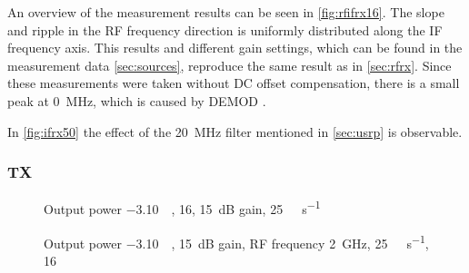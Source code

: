 \documentclass[12pt,a4paper,parskip=full]{scrartcl}
\begin{document}
An overview of the measurement results can be seen in \cref{fig:rfifrx16}. The slope and ripple
in the RF frequency direction is uniformly distributed along the IF frequency axis.
This results and different gain settings, which can be found in the measurement data \ref{sec:sources},
reproduce the same result as in \cref{sec:rfrx}. Since these measurements were taken without DC offset
compensation, there is a small peak at \SI{0}{\mega\hertz}, which is caused by DEMOD \cite{demod}.

In \ref{fig:ifrx50} the effect of the \SI{20}{\mega\hertz} filter mentioned in \cref{sec:usrp} is
observable.

\subsubsection{TX}
\label{sec:iftx}
\begin{figure}[htbp]
    \centering
{}
    \caption{Output power \SI{-3.10}{\deci\belfs}, \SI{16}{\bit}, \SI{15}{\deci\bel} gain, \SI{25}{\mega\samples\per\second}}
    \label{fig:rfiftx16}
\end{figure}
\begin{figure}[htbp]
    \centering
{}
    \caption{Output power \SI{-3.10}{\deci\belfs}, \SI{15}{\deci\bel} gain, RF frequency \SI{2}{\giga\hertz}, \SI{25}{\mega\samples\per\second}, \SI{16}{\bit}}
    \label{fig:iftx}
\end{figure}
\end{document}
